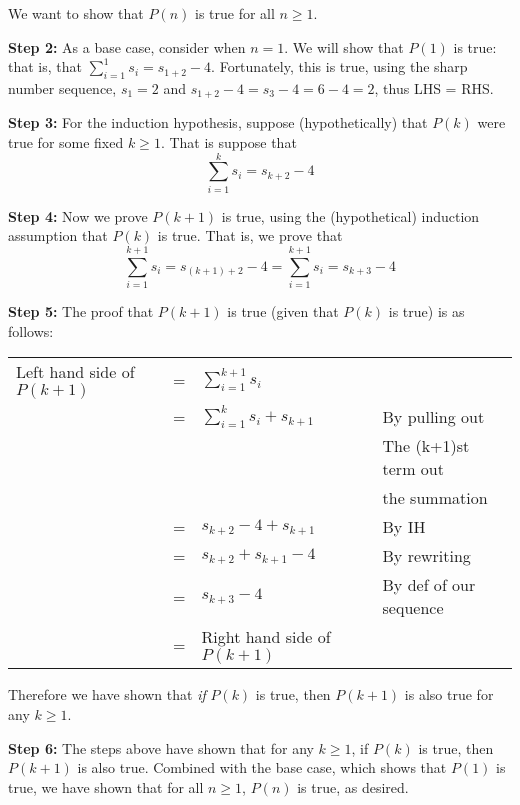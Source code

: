 \documentclass{article}
\begin{document}
\hspace{15pt} We want to show that $P(n)$ is true for all $n\geq 1$.

\vspace{15pt}

\textbf{Step 2:} As a base case, consider when $n=1$.  We will show that $P(1)$ is true: that is, that $\sum_{i=1}^{1} s_i=s_{1+2}-4$.  Fortunately, this is true, using the sharp number sequence, $s_1=2$ and $s_{1+2}-4=s_3-4=6-4=2$, thus LHS = RHS.

\vspace{15pt}

\textbf{Step 3:} For the induction hypothesis, suppose (hypothetically) that $P(k)$ were true for some fixed $k\geq 1$. That is suppose that
\[
	\sum_{i=1}^{k} s_i=s_{k+2}-4	
\]
 
\vspace{15pt}

\textbf{Step 4:} Now we prove $P(k+1)$ is true, using the (hypothetical) induction assumption that $P(k)$ is true. That is, we prove that 
\[
	\sum_{i=1}^{k+1} s_i=s_{(k+1)+2}-4
	= \sum_{i=1}^{k+1} s_i=s_{k+3}-4	
\]

\vspace{15pt}

\textbf{Step 5:} The proof that $P(k+1)$ is true (given that $P(k)$ is true) is as follows:

\begin{sloppypar}
	\begin{tabular}{l l l l}
		Left hand side of $P(k+1)$ & = & $\sum_{i=1}^{k+1} s_i$ & \\
								   & = & $\sum_{i=1}^{k} s_i + s_{k+1}$ & By pulling out\\
								   &   &                                & The (k+1)st term out \\
								   &   &                                & the summation \\
								   & = & $s_{k+2}-4+s_{k+1}$ & By IH \\
								   & = & $s_{k+2}+s_{k+1}-4$ & By rewriting \\
								   & = & $s_{k+3}-4$ & By def of our sequence \\
								   & = & Right hand side of $P(k+1)$
		
	\end{tabular}	
\end{sloppypar}

Therefore we have shown that \textit{if} $P(k)$ is true, then $P(k+1)$ is also true for any $k\geq 1$.\vspace{15pt}


\textbf{Step 6:} The steps above have shown that for any $k\geq 1$, if $P(k)$ is true, then $P(k+1)$ is also true. Combined with the base case, which shows that $P(1)$ is true, we have shown that for all $n\geq 1$, $P(n)$ is true, as desired.
\end{document}
